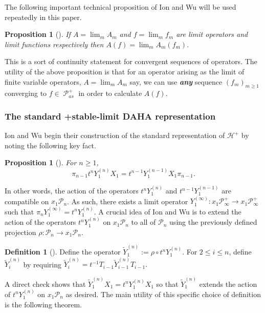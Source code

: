 \documentclass[11pt]{article}
\newtheorem{prop}[theo]{Proposition}
\theoremstyle{definition}
\newtheorem{defi}[theo]{Definition}
\numberwithin{equation}{section}
\DeclareMathOperator{\sP}{\mathscr{P} }
\begin{document}
The following important technical proposition of Ion and Wu will be used repeatedly in this paper. 

\begin{prop}[{\cite[Prop. 6.21]{Ion_2022}}]
    If $A = \lim_{m} A_m$ and $f = \lim_{m} f_m$ are limit operators and limit functions respectively then $A(f) = \lim_{m} A_m(f_m).$
\end{prop}

This is a sort of continuity statement for convergent sequences of operators. The utility of the above proposition is that for an operator arising as the limit of finite variable operators, $A = \lim_{m} A_m$ say, we can use \textbf{\textit{any}} sequence $(f_m)_{m \geq 1}$ converging to $f \in \sP_{as}^{+}$ in order to calculate $A(f)$. 

\subsubsection{The standard +stable-limit DAHA representation}

Ion and Wu begin their construction of the standard representation of $\mathscr{H}^{+}$ by noting the following key fact. 

\begin{prop}[{\cite[Prop. 6.2]{Ion_2022}}]
    For $n \geq 1$,  
    $$\pi_{n-1} t^n Y_1^{(n)}X_1 = t^{n-1} Y_1^{(n-1)}X_1\pi_{n-1}.$$
\end{prop}

In other words, the action of the operators $t^nY_1^{(n)}$ and $t^{n-1}Y_1^{(n-1)}$ are compatible on $x_1\mathscr{P}_{n}$. As such, there exists a limit operator $Y_1^{(\infty)}: x_1\mathscr{P}^{+}_{\infty} \rightarrow x_1\mathscr{P}^{+}_{\infty}$ such that $\pi_nY_1^{(\infty)} = t^nY_1^{(n)}$. A crucial idea of Ion and Wu is to extend the action of the operators $t^n Y_1^{(n)}$ on $x_1\mathscr{P}_{n}$ to all of $\mathscr{P}_{n}$ using the previously defined projection $\rho:\mathscr{P}_{n} \rightarrow x_1\mathscr{P}_{n}$.

\begin{defi}[\cite{Ion_2022}] \label{defn of deformed y's}
    Define the operator $\widetilde{Y}_1^{(n)} :=  \rho \circ t^n Y_1^{(n)}$. For $2 \leq i \leq n$, define $\widetilde{Y}_i^{(n)}$ by requiring $\widetilde{Y}_i^{(n)} = t^{-1}T_{i-1}\widetilde{Y}_{i-1}^{(n)}T_{i-1}.$
\end{defi}

A direct check shows that $\widetilde{Y}_1^{(n)}X_1 = t^n Y_1^{(n)}X_1$ so that $\widetilde{Y}_1^{(n)}$ extends the action of $t^n Y_1^{(n)}$ on $x_1\mathscr{P}_{n}$ as desired. The main utility of this specific choice of definition is the following theorem.
\end{document}
